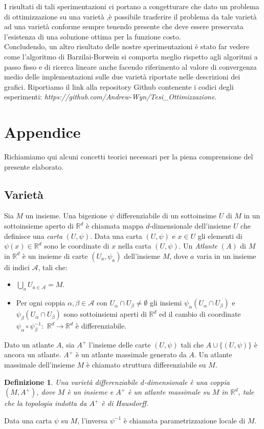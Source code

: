 \documentclass[a4paper, 12pt]{article}
\newtheorem{definition}{Definizione}
\begin{document}
I risultati di tali sperimentazioni ci portano a congetturare che dato un problema di ottimizzazione su una varietà ,è possibile trasferire il problema da tale varietà ad una varietà conforme sempre tenendo presente che deve essere preservata l'esistenza di una soluzione ottima per la funzione costo.\\
Concludendo, un altro risultato delle nostre sperimentazioni è stato far vedere come l'algoritmo di Barzilai-Borwein si comporta meglio rispetto agli algoritmi a passo fisso e di ricerca lineare anche facendo riferimento al valore di convergenza medio delle implementazioni sulle due varietà riportate nelle descrizioni dei grafici.
Riportiamo il link alla repository Github contenente i codici degli esperimenti: \textit{https://github.com/Andrew-Wyn/Tesi\_Ottimizzazione}.
\section{Appendice}
Richiamiamo qui alcuni concetti teorici necessari per la piena comprensione del presente elaborato.
\subsection{Varietà}
Sia $M$ un insieme. Una bigezione $\psi$ differenziabile di un sottoinsime $U$ di $M$ in un sottoinsieme aperto di $\mathbb{R}^d$ è chiamata mappa $d$-dimensionale dell'insieme $U$ che definisce una \textit{carta} $(U, \psi)$. Data una carta $(U, \psi)$ e $x \in U$ gli elementi di $\psi(x) \in \mathbb{R}^d$ sono le coordinate di $x$ nella carta $(U, \psi)$. Un \textit{Atlante} $(A)$ di $M$ in $\mathbb{R}^d$ è un insieme di carte $(U_a, \psi_a)$ dell'insieme $M$, dove $a$ varia in un insieme di indici $\mathcal{A}$, tali che:
\begin{itemize}
    \item $\bigcup_a U_{a \in \mathcal{A}} = M$.
    \item Per ogni coppia $\alpha, \beta \in \mathcal{A}$ con $U_{\alpha} \cap U_{\beta} \neq \emptyset$ gli insiemi $\psi_{\alpha}(U_{\alpha} \cap U_{\beta})$ e $\psi_{\beta}(U_{\alpha} \cap U_{\beta})$ sono sottoinsiemi aperti di $\mathbb{R}^d$ ed il cambio di coordinate $\psi_{\alpha} \circ \psi_{\beta}^{-1}:$ $\mathbb{R}^d \to \mathbb{R}^d$ è differenziabile.
\end{itemize}
Dato un atlante $A$, sia $A^+$ l'insieme delle carte $(U, \psi)$ tali che $A \cup \{(U, \psi)\}$ è ancora un atlante. $A^+$ è un atlante massimale generato da $A$. Un atlante massimale dell'insieme $M$ è chiamato struttura differenziabile su $M$.
\begin{definition}
Una varietà differenziabile $d$-dimensionale è una coppia $(M, A^+)$, dove $M$ è un insieme e $A^+$ è un atlante massimale su $M$ in $\mathbb{R}^d$, tale che la topologia indotta da $A^+$ è di Hausdorff.
\end{definition}
Data una carta $\psi$ su $M$, l'inversa $\psi^{-1}$ è chiamata parametrizzazione locale di $M$.
\end{document}
